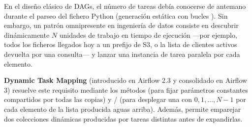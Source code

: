 En el diseño clásico de DAGs, el número de tareas debía conocerse de antemano durante el parseo del fichero Python (generación estática con bucles ). Sin embargo, un patrón omnipresente en ingeniería de datos consiste en descubrir dinámicamente $N$ unidades de trabajo en tiempo de ejecución ---por ejemplo, todos los ficheros llegados hoy a un prefijo de S3, o la lista de clientes activos devuelta por una consulta--- y lanzar una instancia de tarea paralela por cada elemento.

\textbf{Dynamic Task Mapping} (introducido en Airflow 2.3 y consolidado en Airflow 3) resuelve este requisito mediante los métodos  (para fijar parámetros constantes compartidos por todas las copias) y  /  (para desplegar una  con  $0, 1, \dots, N-1$ por cada elemento de la lista producida aguas arriba). Además,  permite emparejar dos colecciones dinámicas producidas por tareas distintas antes de expandirlas.

